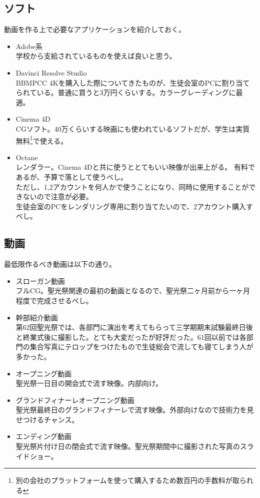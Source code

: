 \documentclass[dvipdfmx,jb5]{jarticle}
\begin{document}
\subsection{ソフト}
 動画を作る上で必要なアプリケーションを紹介しておく。
 \begin{itemize}
  \item Adobe系\\
  学校から支給されているものを使えば良いと思う。
  \item Davinci Resolve Studio\\
  BBMPCC 4Kを購入した際についてきたものが、生徒会室のPCに割り当てられている。普通に買うと3万円くらいする。カラーグレーディングに最適。
  \item Cinema 4D\\
  CGソフト。40万くらいする映画にも使われているソフトだが、学生は実質無料\footnote{別の会社のプラットフォームを使って購入するため数百円の手数料が取られる}で使える。
  \item Octane\\
  レンダラー。Cinema 4Dと共に使うととてもいい映像が出来上がる。
  有料であるが、予算で落として使うべし。\\ただし、1,2アカウントを何人かで使うことになり、同時に使用することができないので注意が必要。\\生徒会室のPCをレンダリング専用に割り当てたいので、2アカウント購入すべし。
 \end{itemize}
\subsection{動画}
最低限作るべき動画は以下の通り。
 \begin{itemize}
  \item スローガン動画\\
  フルCG。聖光祭関連の最初の動画となるので、聖光祭二ヶ月前から一ヶ月程度で完成させるべし。
  \item 幹部紹介動画\\
  第62回聖光祭では、各部門に演出を考えてもらって三学期期末試験最終日後と終業式後に撮影した。とても大変だったが好評だった。61回以前では各部門の集合写真にテロップをつけたもので生徒総会で流しても寝てしまう人が多かった。

  \item オープニング動画\\
  聖光祭一日目の開会式で流す映像。内部向け。
  \item グランドフィナーレオープニング動画\\
  聖光祭最終日のグランドフィナーレで流す映像。外部向けなので技術力を見せつけるチャンス。
  \item エンディング動画\\
  聖光祭片付け日の閉会式で流す映像。聖光祭期間中に撮影された写真のスライドショー。
 \end{itemize}
 \newpage
\end{document}

